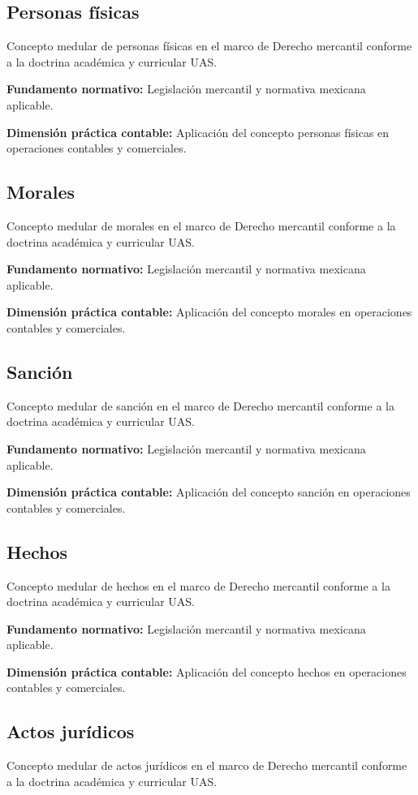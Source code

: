 {\subsection{Personas físicas}
Concepto medular de personas físicas en el marco de Derecho mercantil conforme a la doctrina académica y curricular UAS.

\textbf{Fundamento normativo:} Legislación mercantil y normativa mexicana aplicable.

\textbf{Dimensión práctica contable:} Aplicación del concepto personas físicas en operaciones contables y comerciales.

\subsection{Morales}
Concepto medular de morales en el marco de Derecho mercantil conforme a la doctrina académica y curricular UAS.

\textbf{Fundamento normativo:} Legislación mercantil y normativa mexicana aplicable.

\textbf{Dimensión práctica contable:} Aplicación del concepto morales en operaciones contables y comerciales.

\subsection{Sanción}
Concepto medular de sanción en el marco de Derecho mercantil conforme a la doctrina académica y curricular UAS.

\textbf{Fundamento normativo:} Legislación mercantil y normativa mexicana aplicable.

\textbf{Dimensión práctica contable:} Aplicación del concepto sanción en operaciones contables y comerciales.

\subsection{Hechos}
Concepto medular de hechos en el marco de Derecho mercantil conforme a la doctrina académica y curricular UAS.

\textbf{Fundamento normativo:} Legislación mercantil y normativa mexicana aplicable.

\textbf{Dimensión práctica contable:} Aplicación del concepto hechos en operaciones contables y comerciales.

\subsection{Actos jurídicos}
Concepto medular de actos jurídicos en el marco de Derecho mercantil conforme a la doctrina académica y curricular UAS.

}
